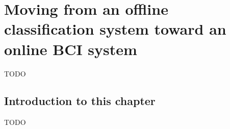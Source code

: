 





\chapter{Moving from an offline classification system toward an online BCI system}
\label{ch:online_bci_system}
TODO

\section{Introduction to this chapter}
\label{sec:online_bci_system_introduction}

TODO

